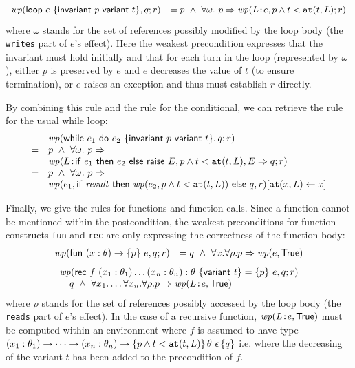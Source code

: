 \documentclass[a4paper,12pt]{report}
\begin{document}
\begin{displaymath}
  \begin{array}{rl}
    \mathit{wp}(\mathsf{loop}~e~\{\mathsf{invariant}~p~\mathsf{variant}~t\},q;r) & = 
       p ~\land~ \forall\omega. ~ 
       p \Rightarrow \mathit{wp}(L\texttt{:}e,p\land t<\mathtt{at}(t,L);r) \\
  \end{array}
\end{displaymath}
where $\omega$ stands for the set of references possibly modified by
the loop body (the \texttt{writes} part of $e$'s effect).
Here the weakest precondition expresses that the invariant must hold
initially and that for each turn in the loop (represented by
$\omega$), either
$p$ is preserved by $e$ and $e$ decreases the value of $t$ (to ensure
termination), or $e$ raises an exception and thus must establish $r$
directly. 

By combining this rule and the rule for the conditional, we can retrieve
the rule for the usual while loop:
\begin{displaymath}
  \begin{array}{ll}
    & \wprx{\pwhileI{e_1}{e_2}{p}{t}}{q}{r} \\
   =& p ~\land~ \forall\omega. ~ p \Rightarrow \\
    &    \mathit{wp}(\plabel{L}{\pite{e_1}{e_2}{\kw{raise}~E}},
         p\land t<\at{t}{L},E\Rightarrow q;r) \\
   =&p ~\land~ \forall\omega. ~ p \Rightarrow \\
    & \mathit{wp}(e_1,\pite{\result}{\wpre{e_2}{p\land t<\at{t}{L}}}{q},r)%
      [\at{x}{L}\leftarrow x]
  \end{array}
\end{displaymath}

Finally, we give the rules for functions and function calls.
Since a function cannot be mentioned within the postcondition, the
weakest preconditions for function constructs \texttt{fun} and
\texttt{rec} are only expressing the correctness of the function body:
\begin{displaymath}
  \begin{array}{rl}
    \mathit{wp}(\mathsf{fun}~(x:\theta)\rightarrow\{p\}~e,q;r) 
    & = q ~\land~ \forall x.\forall\rho. p \Rightarrow\mathit{wp}(e,\textsf{True})
  \end{array}
\end{displaymath}
\begin{displaymath}
  \begin{array}{l}
    \mathit{wp}(\mathsf{rec}~f~(x_1:\theta_1)\dots(x_n:\theta_n):\theta~\{\mathsf{variant}~t\}=\{p\}~e,q;r)
    \\ = q ~\land~ \forall x_1.\dots\forall x_n.\forall\rho. 
    p \Rightarrow\mathit{wp}(L\texttt{:}e,\textsf{True})
  \end{array}
\end{displaymath}
where $\rho$ stands for the set of references possibly accessed by
the loop body (the \texttt{reads} part of $e$'s effect).
In the case of a recursive function,
$\mathit{wp}(L\texttt{:}e,\textsf{True})$ must be computed within an
environment where $f$ is assumed to have type
$(x_1:\theta_1)\rightarrow\cdots\rightarrow(x_n:\theta_n)\rightarrow\{p\land
  t<\mathtt{at}(t,L)\}\,\theta~\epsilon\,\{q\}$
i.e. where the decreasing of the variant $t$ has been added to the
precondition of $f$.
\end{document}
